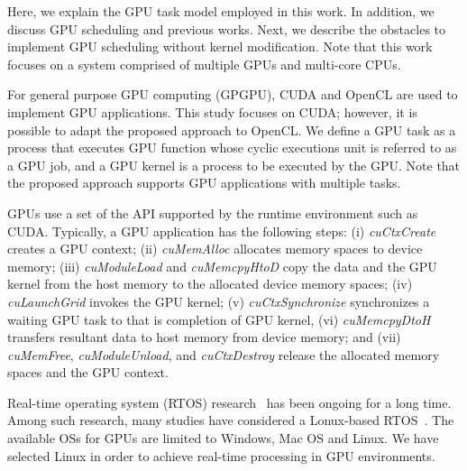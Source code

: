 \label{sec:system_model}
Here, we explain the GPU task model employed in this work.
In addition, we discuss GPU scheduling and previous works.
Next, we describe the obstacles to implement GPU scheduling without kernel modification.
Note that this work focuses on a system comprised of multiple GPUs and multi-core CPUs.

For general purpose GPU computing (GPGPU), CUDA and OpenCL are used to implement GPU applications.
This study focuses on CUDA; however, it is possible to adapt the proposed approach to OpenCL.
We define a GPU task as a process that executes GPU function whose cyclic executions unit is referred to as a GPU job,
and a GPU kernel is a process to be executed by the GPU.
Note that the proposed approach supports GPU applications with multiple tasks.

GPUs use a set of the API supported by the runtime environment such as CUDA.
Typically, a GPU application has the following steps:
(i) \textit{cuCtxCreate} creates a GPU context;
(ii) \textit{cuMemAlloc} allocates memory spaces to device memory; 
(iii) \textit{cuModuleLoad} and \textit{cuMemcpyHtoD} copy the data and the GPU kernel from the host memory to the allocated device memory spaces;
(iv) \textit{cuLaunchGrid} invokes the GPU kernel;
(v) \textit{cuCtxSynchronize} synchronizes a waiting GPU task to that is completion of GPU kernel,
(vi) \textit{cuMemcpyDtoH} transfers resultant data to host memory from device memory; and
(vii) \textit{cuMemFree}, \textit{cuModuleUnload}, and \textit{cuCtxDestroy} release the allocated memory spaces and the GPU context.

Real-time operating system (RTOS) research~\cite{spring,redline,itron,rk} has been ongoing for a long time.
Among such research, many studies have considered a Lonux-based RTOS~\cite{litmus,prk,rtai,yodaiken1999rtlinux,kato2009loadable}.
The available OSs for GPUs are limited to Windows, Mac OS and Linux.
We have selected Linux in order to achieve real-time processing in GPU environments.

